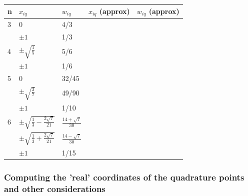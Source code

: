 \begin{center}
\begin{tabular}{lllll}
\hline
n & $x_{iq}$ & $w_{iq}$ & $x_{iq}$ (approx) & $w_{iq}$ (approx) \\
\hline\hline
3 & 0 & 4/3 & & \\
  & $\pm 1$ & 1/3 & &  \\
\hline
4 & $\pm\sqrt{\frac{1}{5}}$ & 5/6 & & \\
  & $\pm 1$ & 1/6 & & \\
\hline
5 & 0 & 32/45 & & \\
  & $\pm\sqrt{\frac{3}{7}}$ & 49/90 & & \\
  & $\pm 1$ & 1/10 & & \\
\hline
6 & $\pm\sqrt{\frac{1}{3} -\frac{2\sqrt{7}}{21}}$ & $\frac{14+\sqrt{7}}{30}$ & & \\
  & $\pm\sqrt{\frac{1}{3} +\frac{2\sqrt{7}}{21}}$ & $\frac{14-\sqrt{7}}{30}$ & & \\
  & $\pm 1$ & 1/15 \\
\hline
\end{tabular}
\end{center}

 
\subsubsection{Computing the 'real' coordinates of the quadrature points and other considerations}

